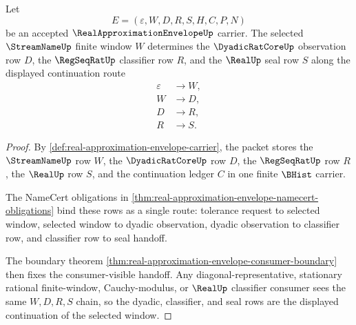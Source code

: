 \begin{theorem}
\label{thm:real-approximation-envelope-dyadic-classifier-handoff}
Let
$$
E=(\varepsilon,W,D,R,S,H,C,P,N)
$$
be an accepted $\RealApproximationEnvelopeUp$ carrier. The selected $\StreamNameUp$ finite window $W$ determines the $\DyadicRatCoreUp$ observation row $D$, the $\RegSeqRatUp$ classifier row $R$, and the $\RealUp$ seal row $S$ along the displayed continuation route
$$
\begin{aligned}
\varepsilon &\longrightarrow W,\\
W &\longrightarrow D,\\
D &\longrightarrow R,\\
R &\longrightarrow S.
\end{aligned}
$$
\end{theorem}
\begin{proof}
By \autoref{def:real-approximation-envelope-carrier}, the packet stores the $\StreamNameUp$ row $W$, the $\DyadicRatCoreUp$ row $D$, the $\RegSeqRatUp$ row $R$, the $\RealUp$ row $S$, and the continuation ledger $C$ in one finite $\BHist$ carrier.

The NameCert obligations in \autoref{thm:real-approximation-envelope-namecert-obligations} bind these rows as a single route: tolerance request to selected window, selected window to dyadic observation, dyadic observation to classifier row, and classifier row to seal handoff.

The boundary theorem \autoref{thm:real-approximation-envelope-consumer-boundary} then fixes the consumer-visible handoff. Any diagonal-representative, stationary rational finite-window, Cauchy-modulus, or $\RealUp$ classifier consumer sees the same $W,D,R,S$ chain, so the dyadic, classifier, and seal rows are the displayed continuation of the selected window.
\end{proof}

